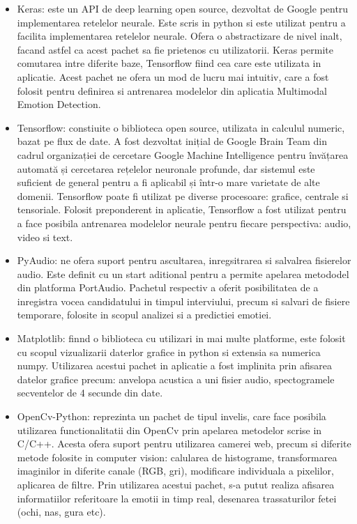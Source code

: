 \documentclass[a4paper, 12pt]{report}
\begin{document}
	\begin{itemize}
		\item Keras: este un API de deep learning open source, dezvoltat de Google pentru implementarea retelelor neurale. Este scris in python si este utilizat pentru a facilita implementarea retelelor neurale. Ofera o abstractizare de nivel inalt, facand astfel ca acest pachet sa fie prietenos cu utilizatorii. Keras permite comutarea intre diferite baze, Tensorflow fiind cea care este utilizata in aplicatie. Acest pachet ne ofera un mod de lucru mai intuitiv, care a fost folosit pentru definirea si antrenarea modelelor din aplicatia Multimodal Emotion Detection.
		
		\item Tensorflow: constiuite o biblioteca open source, utilizata in calculul numeric, bazat pe flux de date. A fost dezvoltat inițial de Google Brain Team din cadrul organizației de cercetare Google Machine Intelligence pentru învățarea automată și cercetarea rețelelor neuronale profunde, dar sistemul este suficient de general pentru a fi aplicabil și într-o mare varietate de alte domenii. Tensorflow poate fi utilizat pe diverse procesoare: grafice, centrale si tensoriale. Folosit preponderent in aplicatie, Tensorflow a fost utilizat pentru a face posibila antrenarea modelelor neurale pentru fiecare perspectiva: audio, video si text.
		
		\item PyAudio: ne ofera suport pentru ascultarea, inregsitrarea si salvalrea fisierelor audio. Este definit cu un start aditional pentru a permite apelarea metododel din platforma PortAudio. Pachetul respectiv a oferit posibilitatea de a inregistra vocea candidatului in timpul interviului, precum si salvari de fisiere temporare, folosite in scopul analizei si a predictiei emotiei.
		
		\item Matplotlib: finnd o biblioteca cu utilizari in mai multe platforme, este folosit cu scopul vizualizarii daterlor grafice in python si extensia sa numerica numpy. Utilizarea acestui pachet in aplicatie a fost implinita prin afisarea datelor grafice precum: anvelopa acustica a uni fisier audio, spectogramele secventelor de 4 secunde din date.
		
		\item OpenCv-Python: reprezinta un pachet de tipul invelis, care face posibila utilizarea functionalitatii din OpenCv prin apelarea metodelor scrise in C/C++. Acesta ofera suport pentru utilizarea camerei web, precum si diferite metode folosite in computer vision: calularea de histograme, transformarea imaginilor in diferite canale (RGB, gri), modificare individuala a pixelilor, aplicarea de filtre. Prin utilizarea acestui pachet, s-a putut realiza afisarea informatiilor referitoare la emotii in timp real, desenarea trassaturilor fetei (ochi, nas, gura etc).
		

\end{itemize}
\end{document}
